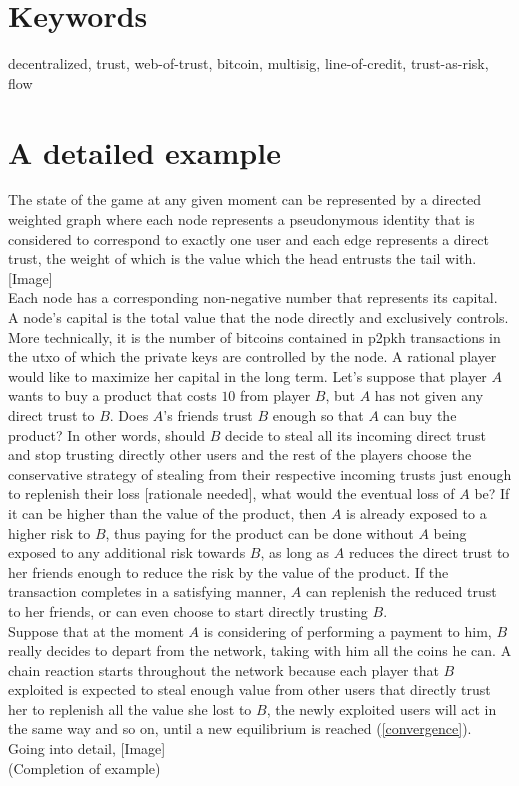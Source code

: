\documentclass[11pt]{article}
\theoremstyle{definition}
\theoremstyle{corollary}
\theoremstyle{lemma}
\begin{document}
  \section{Keywords}
     decentralized, trust, web-of-trust, bitcoin, multisig, line-of-credit, trust-as-risk, flow  

  \section{A detailed example}
     The state of the game at any given moment can be represented by a directed weighted graph where each node represents a
     pseudonymous identity that is considered to correspond to exactly one user and each edge represents a direct trust, the
     weight of which is the value which the head entrusts the tail with. [Image] \\
     Each node has a corresponding non-negative number that represents its capital. A node's capital is the total value that
     the node directly and exclusively controls. More technically, it is the number of bitcoins contained in p2pkh
     transactions in the utxo of which the private keys are controlled by the node. A rational player would like to maximize
     her capital in the long term. Let's suppose that player $A$ wants to buy a product that costs $10$ from player $B$, but
     $A$ has not given any direct trust to $B$. Does $A$'s friends trust $B$ enough so that $A$ can buy the product? In other
     words, should $B$ decide to steal all its incoming direct trust and stop trusting directly other users and the rest of
     the players choose the conservative strategy of stealing from their respective incoming trusts just enough to replenish
     their loss [rationale needed], what would the eventual loss of $A$ be? If it can be higher than the value of the
     product, then $A$ is already exposed to a higher risk to $B$, thus paying for the product can be done without $A$ being
     exposed to any additional risk towards $B$, as long as $A$ reduces the direct trust to her friends enough to reduce the
     risk by the value of the product. If the transaction completes in a satisfying manner, $A$ can replenish the reduced
     trust to her friends, or can even choose to start directly trusting $B$. \\
     Suppose that at the moment $A$ is considering of performing a payment to him, $B$ really decides to depart from the
     network, taking with him all the coins he can. A chain reaction starts throughout the network because each player that
     $B$ exploited is expected to steal enough value from other users that directly trust her to replenish all the value she
     lost to $B$, the newly exploited users will act in the same way and so on, until a new equilibrium is reached
     (\ref{convergence}). Going into detail, [Image] \\
     (Completion of example)
\end{document}

